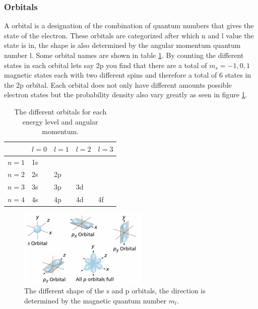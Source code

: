 \documentclass[jmp, amsmath, amssymb, reprint]{article}
\numberwithin{equation}{section}
\begin{document}
\begin{multicols}{2}
\subsubsection{Orbitals}

A orbital is a designation of the combination of quantum numbers that gives the state of the electron. These orbitals are categorized after which n and l value the state is in, the shape is also determined by the angular momentum quantum number l. Some orbital names are shown in table \ref{tabel:1}. By counting the different states in each orbital lets say 2p you find that there are a total of $m_s=-1, 0, 1$ magnetic states each with two different spins and therefore a total of 6 states in the 2p orbital. Each orbital does not only have different amounts possible electron states but the probability density also vary greatly as seen in figure \ref{fig:orbitals}.

\begin{table}[H]
  \begin{center}
    \begin{tabular}{| l | l | l | l | l |}
   	\hline
	 & \(l=0\) & \(l=1\) & \(l=2\) & \(l=3\)\\ \hline
	\(n=1\) & 1s &  &  & \\
	\(n=2\) & 2s & 2p &  & \\
	\(n=3\) & 3s & 3p & 3d & \\
	\(n=4\) & 4s & 4p & 4d & 4f\\ \hline
	\end{tabular}
    \caption{The different orbitals for each energy level and angular momentum.}
    \label{tabel:1}
  \end{center}
\end{table}
\FloatBarrier

\begin{figure}[H]
	\centering
  	\includegraphics[width=0.55\textwidth]{orbitals.png}
	\caption{The different shape of the s and p orbitals, the direction is determined by the magnetic quantum number \(m_l\).}
	\label{fig:orbitals}
\end{figure}


\end{multicols}
\end{document}
